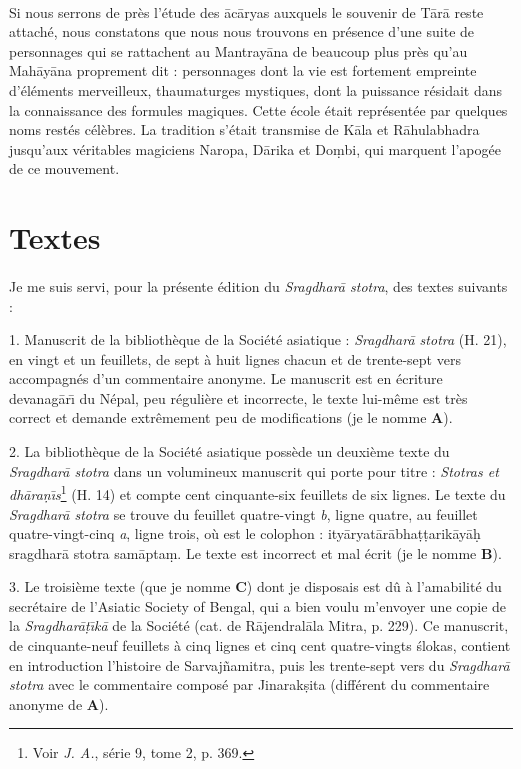 \documentclass[a4paper, 11pt, oneside, french]{article}
\begin{document}
\paragraph{}
Si nous serrons de près l'étude des \={a}c\={a}ryas auxquels le souvenir de T\={a}r\={a} reste attaché, nous constatons que nous nous trouvons en présence d'une suite de personnages qui se rattachent au Mantray\={a}na de beaucoup plus près qu'au Mah\={a}y\={a}na proprement dit : personnages dont la vie est fortement empreinte d'éléments merveilleux, thaumaturges mystiques, dont la puissance résidait dans la connaissance des formules magiques. Cette école était représentée par quelques noms restés célèbres. La tradition s'était transmise de K\={a}la et R\={a}hulabhadra jusqu'aux véritables magiciens Naropa, D\={a}rika et Do\d{m}bi, qui marquent l'apogée de ce mouvement. 
\clearpage
\section{Textes}
\paragraph{}
Je me suis servi, pour la présente édition du \emph{Sragdhar\={a} stotra}, des textes suivants :

1. Manuscrit de la bibliothèque de la Société asiatique : \emph{Sragdhar\={a} stotra} (H. 21), en vingt et un feuillets, de sept à huit lignes chacun et de trente-sept vers accompagnés d'un commentaire anonyme. Le manuscrit est en écriture devanag\={a}r\={\i} du Népal, peu régulière et incorrecte, le texte lui-même est très correct et demande extrêmement peu de modifications (je le nomme \textbf{A}).

2. La bibliothèque de la Société asiatique possède un deuxième texte du \emph{Sragdhar\={a} stotra} dans un volumineux manuscrit qui porte pour titre : \emph{Stotras et dh\={a}ra\d{n}\={\i}s}\footnote{Voir \emph{J. A.}, série 9, tome 2, p. 369.} (H. 14) et compte cent cinquante-six feuillets de six lignes. Le texte du \emph{Sragdhar\={a} stotra} se trouve du feuillet quatre-vingt \emph{b}, ligne quatre, au feuillet quatre-vingt-cinq \emph{a}, ligne trois, où est le colophon : ity\={a}ryat\={a}r\={a}bha\d{t}\d{t}arik\={a}y\={a}\d{h} sragdhar\={a} stotra sam\={a}pta\d{m}. Le texte est incorrect et mal écrit (je le nomme \textbf{B}).

3. Le troisième texte (que je nomme \textbf{C}) dont je disposais est dû à l'amabilité du secrétaire de l'Asiatic Society of Bengal, qui a bien voulu m'envoyer une copie de la \emph{Sragdhar\={a}\d{t}\={\i}k\={a}} de la Société (cat. de R\={a}jendral\={a}la Mitra, p. 229). Ce manuscrit, de cinquante-neuf feuillets à cinq lignes et cinq cent quatre-vingts \'{s}lokas, contient en introduction l'histoire de Sarvaj\~{n}amitra, puis les trente-sept vers du \emph{Sragdhar\={a} stotra} avec le commentaire composé par Jinarak\d{s}ita (différent du commentaire anonyme de \textbf{A}).
\end{document}
